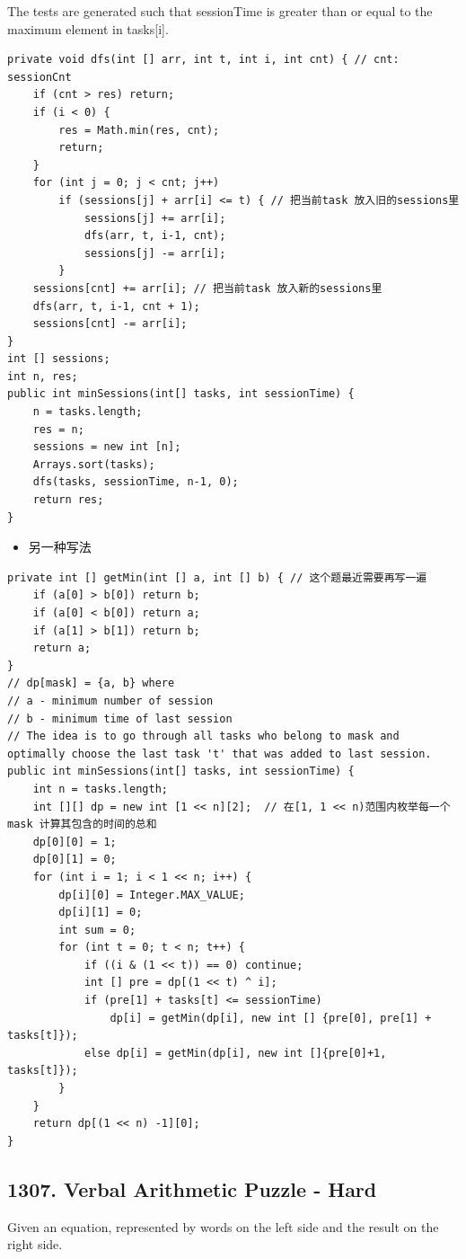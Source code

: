\documentclass[9pt, b5paaper]{book}
\begin{document}
The tests are generated such that sessionTime is greater than or equal to the maximum element in tasks[i].
\begin{verbatim}
private void dfs(int [] arr, int t, int i, int cnt) { // cnt: sessionCnt
    if (cnt > res) return;
    if (i < 0) {
        res = Math.min(res, cnt);
        return;
    }
    for (int j = 0; j < cnt; j++) 
        if (sessions[j] + arr[i] <= t) { // 把当前task 放入旧的sessions里
            sessions[j] += arr[i];
            dfs(arr, t, i-1, cnt);
            sessions[j] -= arr[i];
        }
    sessions[cnt] += arr[i]; // 把当前task 放入新的sessions里
    dfs(arr, t, i-1, cnt + 1);
    sessions[cnt] -= arr[i];
}
int [] sessions;
int n, res;
public int minSessions(int[] tasks, int sessionTime) {
    n = tasks.length;
    res = n;
    sessions = new int [n];
    Arrays.sort(tasks);
    dfs(tasks, sessionTime, n-1, 0);
    return res;
}
\end{verbatim}
\begin{itemize}
\item 另一种写法
\end{itemize}
\begin{verbatim}
private int [] getMin(int [] a, int [] b) { // 这个题最近需要再写一遍
    if (a[0] > b[0]) return b;
    if (a[0] < b[0]) return a;
    if (a[1] > b[1]) return b;
    return a;
}
// dp[mask] = {a, b} where
// a - minimum number of session
// b - minimum time of last session
// The idea is to go through all tasks who belong to mask and optimally choose the last task 't' that was added to last session.
public int minSessions(int[] tasks, int sessionTime) {
    int n = tasks.length;
    int [][] dp = new int [1 << n][2];  // 在[1, 1 << n)范围内枚举每一个mask 计算其包含的时间的总和
    dp[0][0] = 1;
    dp[0][1] = 0;
    for (int i = 1; i < 1 << n; i++) {
        dp[i][0] = Integer.MAX_VALUE;
        dp[i][1] = 0;
        int sum = 0;
        for (int t = 0; t < n; t++) {
            if ((i & (1 << t)) == 0) continue;
            int [] pre = dp[(1 << t) ^ i];
            if (pre[1] + tasks[t] <= sessionTime)
                dp[i] = getMin(dp[i], new int [] {pre[0], pre[1] + tasks[t]});
            else dp[i] = getMin(dp[i], new int []{pre[0]+1, tasks[t]});
        }
    }
    return dp[(1 << n) -1][0];
}
\end{verbatim}

\subsection{1307. Verbal Arithmetic Puzzle - Hard}
\label{sec-8-0-3}
Given an equation, represented by words on the left side and the result on the right side.
\end{document}
